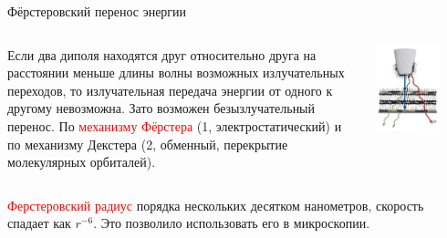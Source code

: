 \documentclass[9pt, compress, xcolor=table]{beamer}
\begin{document}
\begin{frame}{Фёрстеровский перенос энергии}

\begin{columns}[c]

\column{5cm}

Если два диполя находятся друг относительно друга на расстоянии меньше длины волны возможных излучательных переходов, то излучательная передача энергии от одного к другому невозможна. Зато возможен безызлучательный перенос. По \textcolor{red}{механизму Фёрстера} (1, электростатический) и по механизму Декстера (2, обменный, перекрытие молекулярных орбиталей). 

\column{7cm}
\begin{center}
\includegraphics[width=0.7\textwidth]{fret}
\end{center}
\end{columns}

\textcolor{red}{Ферстеровский радиус} порядка нескольких десятком нанометров, скорость спадает как $r^{-6}$. Это позволило использовать его в микроскопии.


\end{frame}
\end{document}
